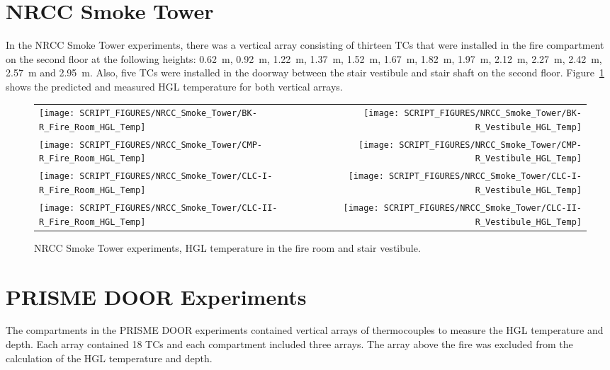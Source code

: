 \clearpage

\section{NRCC Smoke Tower}

In the NRCC Smoke Tower experiments, there was a vertical array consisting of thirteen TCs that were installed in the fire compartment on the second floor at the following heights: 0.62~m, 0.92~m, 1.22~m, 1.37~m, 1.52~m, 1.67~m, 1.82~m, 1.97~m, 2.12~m, 2.27~m, 2.42~m, 2.57~m and 2.95~m. Also, five TCs were installed in the doorway between the stair vestibule and stair shaft on the second floor. Figure~\ref{NRCC_Smoke_Tower_HGL_Temp} shows the predicted and measured HGL temperature for both vertical arrays.

\newpage

\begin{figure}[p]
\begin{tabular*}{\textwidth}{l@{\extracolsep{\fill}}r}
\texttt{[image: SCRIPT\_FIGURES/NRCC\_Smoke\_Tower/BK-R\_Fire\_Room\_HGL\_Temp]} &
\texttt{[image: SCRIPT\_FIGURES/NRCC\_Smoke\_Tower/BK-R\_Vestibule\_HGL\_Temp]} \\
\texttt{[image: SCRIPT\_FIGURES/NRCC\_Smoke\_Tower/CMP-R\_Fire\_Room\_HGL\_Temp]} &
\texttt{[image: SCRIPT\_FIGURES/NRCC\_Smoke\_Tower/CMP-R\_Vestibule\_HGL\_Temp]} \\
\texttt{[image: SCRIPT\_FIGURES/NRCC\_Smoke\_Tower/CLC-I-R\_Fire\_Room\_HGL\_Temp]} &
\texttt{[image: SCRIPT\_FIGURES/NRCC\_Smoke\_Tower/CLC-I-R\_Vestibule\_HGL\_Temp]} \\
\texttt{[image: SCRIPT\_FIGURES/NRCC\_Smoke\_Tower/CLC-II-R\_Fire\_Room\_HGL\_Temp]} &
\texttt{[image: SCRIPT\_FIGURES/NRCC\_Smoke\_Tower/CLC-II-R\_Vestibule\_HGL\_Temp]}
\end{tabular*}
\caption[NRCC Smoke Tower experiments, HGL temperature in the fire room and stair vestibule]
{NRCC Smoke Tower experiments, HGL temperature in the fire room and stair vestibule.}
\label{NRCC_Smoke_Tower_HGL_Temp}
\end{figure}


\clearpage

\section{PRISME DOOR Experiments}

The compartments in the PRISME DOOR experiments contained vertical arrays of thermocouples to measure the HGL temperature and depth. Each array contained 18 TCs and each compartment included three arrays. The array above the fire was excluded from the calculation of the HGL temperature and depth.

